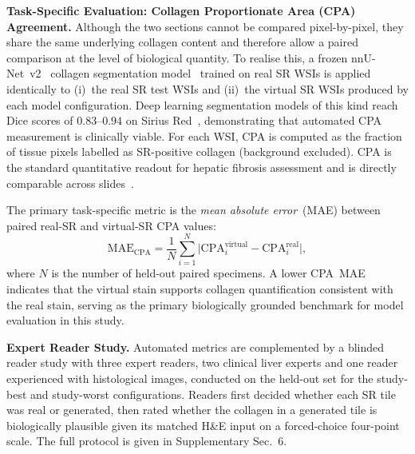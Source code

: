 \noindent\textbf{Task-Specific Evaluation: Collagen Proportionate Area (CPA) Agreement.}
Although the two sections cannot be compared pixel-by-pixel, they share the same
underlying collagen content and therefore allow a paired comparison at the level of
biological quantity. To realise this, a frozen nnU-Net~v2~\cite{isensee2021nnunet}
collagen segmentation model~\cite{deng2026} trained on real SR WSIs is applied
identically to (i)~the real SR test WSIs and (ii)~the virtual SR WSIs produced by each
model configuration.
Deep learning segmentation models of this kind reach Dice scores of $0.83$--$0.94$
on Sirius Red~\cite{liverfibrosis2025, deng2026}, demonstrating that automated CPA
measurement is clinically viable.
For each WSI, CPA is computed as the fraction of tissue pixels labelled as SR-positive
collagen (background excluded).
CPA is the standard quantitative readout for hepatic fibrosis assessment and is
directly comparable across slides~\cite{huang2013sirius}.

The primary task-specific metric is the \textit{mean absolute error}~(MAE) between
paired real-SR and virtual-SR CPA values:
\begin{equation}
  \mathrm{MAE}_{\mathrm{CPA}} = \frac{1}{N}\sum_{i=1}^{N}
  \bigl|\mathrm{CPA}^{\mathrm{virtual}}_{i} - \mathrm{CPA}^{\mathrm{real}}_{i}\bigr|,
  \label{eq:cpa_mae}
\end{equation}
where $N$ is the number of held-out paired specimens.
A lower CPA~MAE indicates that the virtual stain supports collagen quantification
consistent with the real stain, serving as the primary biologically grounded benchmark
for model evaluation in this study.

\noindent\textbf{Expert Reader Study.}
Automated metrics are complemented by a blinded reader study with three expert readers,
two clinical liver experts and one reader experienced with histological images, conducted on the
held-out set for the study-best and study-worst configurations.
Readers first decided whether each SR tile was real or generated, then rated whether the
collagen in a generated tile is biologically plausible given its matched H\&E input on a
forced-choice four-point scale.
The full protocol is given in Supplementary Sec.~6.


